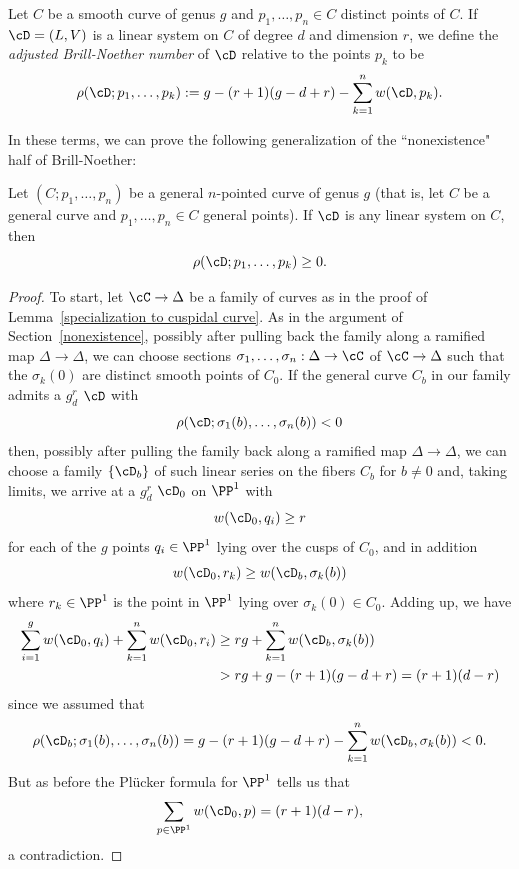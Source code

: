 \begin{definition}
Let $C$ be a smooth curve of genus $g$ and $p_1,\dots,p_n \in C$ distinct points of $C$. If $\cD = (L,V)$ is a linear system on $C$ of degree $d$ and dimension $r$, we define the \emph{adjusted Brill-Noether number} of $\cD$ relative to the points $p_k$ to be
$$
\rho(\cD; p_1,\dots,p_k) := g - (r+1)(g-d+r) - \sum_{k=1}^n w(\cD,p_k).
$$
\end{definition}

In these terms, we can prove the following generalization of the ``nonexistence" half of Brill-Noether:

\begin{theorem}\label{Brill-Noether with inflection}
Let $(C;p_1,\dots,p_n)$ be a general $n$-pointed curve of genus $g$ (that is, let $C$ be a general curve and $p_1,\dots,p_n \in C$ general points). If $\cD$ is any linear system on $C$, then
$$
\rho(\cD; p_1,\dots,p_k) \geq 0.
$$
\end{theorem}

\begin{proof}
To start, let $\cC \to \Delta$ be a family of curves as in the proof of Lemma~\ref{specialization to cuspidal curve}.
As in the argument of Section~\ref{nonexistence}, possibly
after pulling back the family along a ramified map $\Delta \to \Delta$, we can choose sections $\sigma_1, \dots, \sigma_n : \Delta \to \cC$  of $\cC \to \Delta$ such that the $\sigma_k(0)$ are distinct smooth points of $C_0$.
If the general curve $C_b$ in our family admits a $g^r_d$ $\cD$ with
$$
\rho(\cD;\sigma_1(b),\dots,\sigma_n(b)) < 0
$$
then, possibly after pulling the family back along a ramified map $\Delta \to \Delta$, we can choose a family $\{\cD_b\}$ of such linear series 
on the fibers $C_b$ for $b \neq 0$ and, taking limits, we arrive at a $g^r_d$ $\cD_0$ on $\PP^1$ with
$$
w(\cD_0, q_i) \geq r
$$
for each of the $g$ points $q_i \in \PP^1$ lying over the cusps of $C_0$, and in addition
$$
w(\cD_0, r_k) \geq w(\cD_b,\sigma_k(b))
$$
where $r_k \in \PP^1$ is the point in $\PP^1$ lying over $\sigma_k(0) \in C_0$. Adding up, we have
\begin{align*}
\sum_{i=1}^g w(\cD_0, q_i) + \sum_{k=1}^n w(\cD_0, r_i) &\geq rg + \sum_{k=1}^n w(\cD_b,\sigma_k(b)) \\
&> rg + g - (r+1)(g-d+r) = (r+1)(d-r)
\end{align*}
since we assumed that 
$$
\rho(\cD_b;\sigma_1(b),\dots,\sigma_n(b)) = g - (r+1)(g-d+r) - \sum_{k=1}^n w(\cD_b,\sigma_k(b)) < 0.
$$
But as before the Pl\"ucker formula for $\PP^1$ tells us that
$$
\sum_{p \in \PP^1} w(\cD_0, p) = (r+1)(d-r),
$$
a contradiction.
\end{proof}

